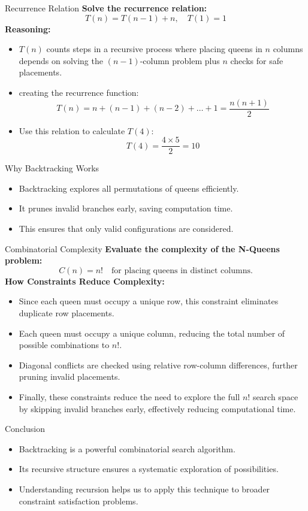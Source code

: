 \documentclass{beamer}
\begin{document}
\begin{frame}{Recurrence Relation}
\textbf{Solve the recurrence relation:}
\[
T(n) = T(n-1) + n, \quad T(1) = 1
\]
\textbf{Reasoning:}
\begin{itemize}
    \item $T(n)$ counts steps in a recursive process where placing queens in $n$ columns depends on solving the $(n-1)$-column problem plus $n$ checks for safe placements.
    \item creating the recurrence function:
    \[
    T(n) = n + (n-1) + (n-2) + \ldots + 1 = \frac{n(n+1)}{2}
    \]
    \item Use this relation to calculate $T(4)$:
    \[
    T(4) = \frac{4 \times 5}{2} = 10
    \]
\end{itemize}
\end{frame}

\begin{frame}{Why Backtracking Works}
\begin{itemize}
    \item Backtracking explores all permutations of queens efficiently.
    \item It prunes invalid branches early, saving computation time.
    \item This ensures that only valid configurations are considered.
\end{itemize}
\end{frame}

\begin{frame}{Combinatorial Complexity}
\textbf{Evaluate the complexity of the N-Queens problem:}
\[
C(n) = n! \quad \text{for placing queens in distinct columns.}
\]
\textbf{How Constraints Reduce Complexity:}
\begin{itemize}
    \item Since each queen must occupy a unique row, this constraint eliminates duplicate row placements.
    \item Each queen must occupy a unique column, reducing the total number of possible combinations to $n!$.
    \item Diagonal conflicts are checked using relative row-column differences, further pruning invalid placements.
    \item Finally, these constraints reduce the need to explore the full $n!$ search space by skipping invalid branches early, effectively reducing computational time.
\end{itemize}
\end{frame}

\begin{frame}{Conclusion}
\begin{itemize}
    \item Backtracking is a powerful combinatorial search algorithm.
    \item Its recursive structure ensures a systematic exploration of possibilities.
    \item Understanding recursion helps us to apply this technique to broader constraint satisfaction problems.
\end{itemize}
\end{frame}
\end{document}
